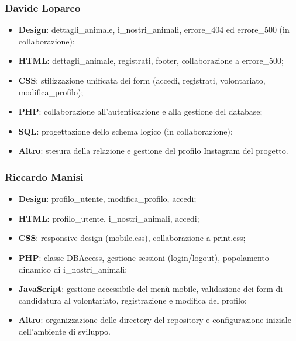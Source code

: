 \documentclass[10pt, letterpaper]{article}
\begin{document}
\subsubsection{Davide Loparco}
\begin{itemize}
    \item \textbf{Design}: dettagli\_animale, i\_nostri\_animali, errore\_404 ed errore\_500 (in collaborazione);
    \item \textbf{HTML}: dettagli\_animale, registrati, footer, collaborazione a errore\_500;
    \item \textbf{CSS}: stilizzazione unificata dei form (accedi, registrati, volontariato, modifica\_profilo);
    \item \textbf{PHP}: collaborazione all’autenticazione e alla gestione del database;
    \item \textbf{SQL}: progettazione dello schema logico (in collaborazione);
    \item \textbf{Altro}: stesura della relazione e gestione del profilo Instagram del progetto.
\end{itemize}

\subsubsection{Riccardo Manisi}
\begin{itemize}
    \item \textbf{Design}: profilo\_utente, modifica\_profilo, accedi;
    \item \textbf{HTML}: profilo\_utente, i\_nostri\_animali, accedi;
    \item \textbf{CSS}: responsive design (mobile.css), collaborazione a print.css;
    \item \textbf{PHP}: classe DBAccess, gestione sessioni (login/logout), popolamento dinamico di i\_nostri\_animali;
    \item \textbf{JavaScript}: gestione accessibile del menù mobile, validazione dei form di candidatura al volontariato, registrazione e modifica del profilo;
    \item \textbf{Altro}: organizzazione delle directory del repository e configurazione iniziale dell’ambiente di sviluppo.
\end{itemize}
\end{document}
